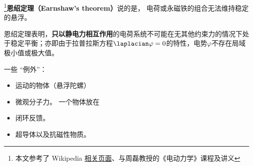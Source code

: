 
\begin{issues}
\issueDraft
\end{issues}

\footnote{本文参考了 Wikipedia \href{https://en.wikipedia.org/wiki/Earnshaw's_theorem}{相关页面}、\cite{GriffE}与周磊教授的《电动力学》课程及讲义}\textbf{恩绍定理（Earnshaw's theorem）}说的是， 电荷或永磁铁的组合无法维持稳定的悬浮。

恩绍定理表明，\textbf{只以静电力相互作用}的电荷系统不可能在无其他约束力的情况下处于稳定平衡；亦即由于拉普拉斯方程$\laplacian \varphi = 0$的特性，电势$\varphi$不存在局域极小值或极大值。

一些 “例外”：
\begin{itemize}
\item 运动的物体（悬浮陀螺）
\item 微观分子力。 一个物体放在
\item 闭环反馈。
\item 超导体以及抗磁性物质。
\end{itemize}

